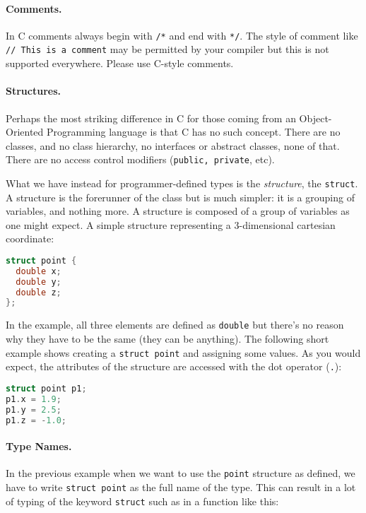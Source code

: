 \paragraph{Comments.} In C comments always begin with \texttt{/*} and end with \texttt{*/}. The style of comment like \texttt{// This is a comment} may be permitted by your compiler but this is not supported everywhere. Please use C-style comments.

\paragraph{Structures.} Perhaps the most striking difference in C for those coming from an Object-Oriented Programming language is that C has no such concept. There are no classes, and no class hierarchy, no interfaces or abstract classes, none of that. There are no access control modifiers (\texttt{public, private}, etc).

What we have instead for programmer-defined types is the \textit{structure}, the \texttt{struct}. A structure is the forerunner of the class but is much simpler: it is a grouping of variables, and nothing more. A structure is composed of a group of variables as one might expect. A simple structure representing a 3-dimensional cartesian coordinate:

\begin{lstlisting}[language=C]
struct point {
  double x;
  double y;
  double z;
};
\end{lstlisting}

In the example, all three elements are defined as \texttt{double} but there's no reason why they have to be the same (they can be anything). The following short example shows creating a \texttt{struct point} and assigning some values. As you would expect, the attributes of the structure are accessed with the dot operator (\texttt{.}):

\begin{lstlisting}[language=C]
struct point p1;
p1.x = 1.9;
p1.y = 2.5;
p1.z = -1.0;
\end{lstlisting}

\paragraph{Type Names.}
In the previous example when we want to use the \texttt{point} structure as defined, we have to write \texttt{struct point} as the full name of the type. This can result in a lot of typing of the keyword \texttt{struct} such as in a function like this:

